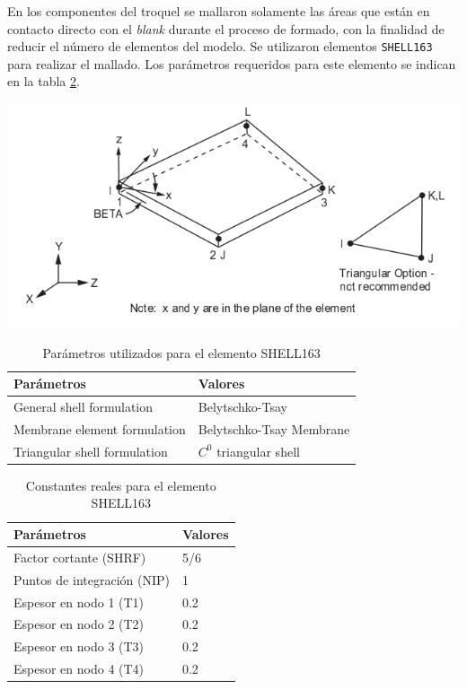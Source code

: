 En los componentes del troquel se mallaron solamente las áreas que están en contacto directo con el 
\textit{blank} durante el proceso de formado, con la finalidad de reducir el número de elementos del modelo. 
Se utilizaron elementos \texttt{SHELL163} para realizar el mallado. Los parámetros requeridos para 
este elemento se indican en la tabla \ref{tab:shell_param}.

\begin{center}
\includegraphics[scale=0.65]{src/ch3/shell163.png}
\label{fig:shell163}
\end{center}


\begin{table}[h]
\centering
\caption{Parámetros utilizados para el elemento SHELL163}
\label{}
\begin{tabular}{p{6cm} p{6cm}} \hline
Parámetros & Valores \\
\hline
General shell formulation & Belytschko-Tsay \\
Membrane element formulation & Belytschko-Tsay Membrane \\
Triangular shell formulation & $C^0$ triangular shell \\
\hline
\end{tabular}
\label{tab:shell_param}
\end{table}


\begin{table}[h]
\centering
\caption{Constantes reales para el elemento SHELL163}
\label{}
\begin{tabular}{p{6cm} p{3cm}} \hline
Parámetros & Valores \\
\hline
Factor cortante (SHRF) & 5/6 \\
Puntos de integración (NIP) & 1 \\
Espesor en nodo 1 (T1) & 0.2 \\
Espesor en nodo 2 (T2) & 0.2 \\
Espesor en nodo 3 (T3) & 0.2 \\
Espesor en nodo 4 (T4) & 0.2 \\
\hline
\end{tabular}
\label{tab:shell_param}
\end{table}


